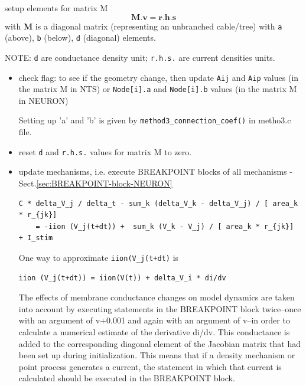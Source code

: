 \begin{itemize}
\begin{enumerate}
     setup elements for matrix M
     \begin{equation}
     \mathbf{M}. \mathbf{v} = \mathbf{r.h.s}
     \end{equation}
     with {\bf M} is a diagonal matrix (representing an unbranched cable/tree)
     with \verb!a! (above), \verb!b! (below), \verb!d! (diagonal) elements.
     
     NOTE: \verb!d! are conductance density unit; \verb!r.h.s.! are current
     densities units.
     
     \begin{itemize}
       \item check flag: to see if the geometry change, then update \verb!Aij!
       and \verb!Aip! values (in the matrix M in NTS) or \verb!Node[i].a! and
       \verb!Node[i].b! values (in the matrix M in NEURON) 
       
 Setting up 'a' and 'b' is given by \verb!method3_connection_coef()! in metho3.c
 file. 
       
       \item reset \verb!d! and \verb!r.h.s.! values for matrix M to zero.
   
       \item update mechanisms, i.e. execute BREAKPOINT blocks of all mechanisms
       - Sect.\ref{sec:BREAKPOINT-block-NEURON}
 
 {\small      
\begin{verbatim}
C * delta_V_j / delta_t - sum_k (delta_V_k - delta_V_j) / [ area_k * r_{jk}]
    = -iion (V_j(t+dt)) +  sum_k (V_k - V_j) / [ area_k * r_{jk}]  + I_stim
\end{verbatim}
}

One way to approximate \verb!iion(V_j(t+dt)! is
\begin{verbatim}
iion (V_j(t+dt)) = iion(V(t)) + delta_V_i * di/dv
\end{verbatim}

The effects of membrane conductance changes on model dynamics are taken into
account by executing statements in the BREAKPOINT block twice--once with an
argument of v+0.001 and again with an argument of v--in order to calculate a
numerical estimate of the derivative di/dv.
This conductance is added to the corresponding diagonal element of the Jacobian
matrix that had been set up during initialization. This means that if a density
mechanism or point process generates a current, the statement in which that
current is calculated should be executed in the BREAKPOINT block.  


\end{itemize}
\end{enumerate}
\end{itemize}
